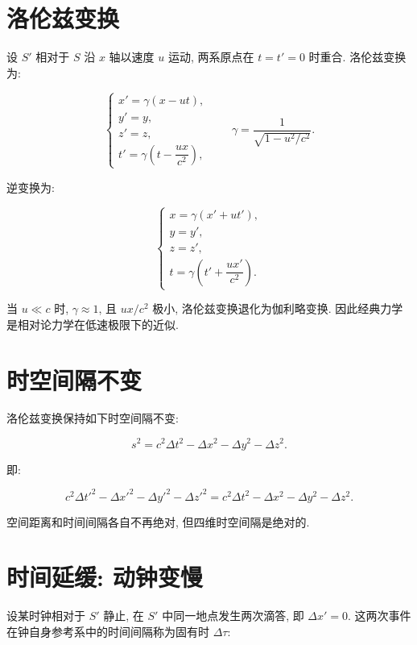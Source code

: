 \documentclass[
  a4paper,
]{ctexrep}
\begin{document}
\section{洛伦兹变换}\label{ux6d1bux4f26ux5179ux53d8ux6362}

设 \(S'\) 相对于 \(S\) 沿 \(x\) 轴以速度 \(u\) 运动, 两系原点在
\(t=t'=0\) 时重合. 洛伦兹变换为:

\[
\begin{cases}
x' = \gamma (x - ut), \\
y' = y, \\
z' = z, \\
t' = \gamma \left(t - \dfrac{ux}{c^2}\right),
\end{cases}
\qquad
\gamma = \frac{1}{\sqrt{1-u^2/c^2}}.
\]

逆变换为:

\[
\begin{cases}
x = \gamma (x' + ut'), \\
y = y', \\
z = z', \\
t = \gamma \left(t' + \dfrac{ux'}{c^2}\right).
\end{cases}
\]

当 \(u \ll c\) 时, \(\gamma \approx 1\), 且 \(ux/c^2\) 极小,
洛伦兹变换退化为伽利略变换. 因此经典力学是相对论力学在低速极限下的近似.

\section{时空间隔不变}\label{ux65f6ux7a7aux95f4ux9694ux4e0dux53d8}

洛伦兹变换保持如下时空间隔不变:

\[
s^2 = c^2\Delta t^2 - \Delta x^2 - \Delta y^2 - \Delta z^2.
\]

即:

\[
c^2\Delta t'^2 - \Delta x'^2 - \Delta y'^2 - \Delta z'^2
=
c^2\Delta t^2 - \Delta x^2 - \Delta y^2 - \Delta z^2.
\]

空间距离和时间间隔各自不再绝对, 但四维时空间隔是绝对的.

\section{时间延缓:
动钟变慢}\label{ux65f6ux95f4ux5ef6ux7f13-ux52a8ux949fux53d8ux6162}

设某时钟相对于 \(S'\) 静止, 在 \(S'\) 中同一地点发生两次滴答, 即
\(\Delta x'=0\). 这两次事件在钟自身参考系中的时间间隔称为固有时
\(\Delta \tau\):
\end{document}
